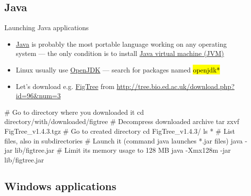\documentclass[compress, ucs, xelatex, 11pt, xcolor=svgnames, aspectratio=169,
	hyperref={
		bookmarks=true,
		unicode=true,
		colorlinks=true,
		pdftitle={Linux, command line and MetaCentrum},
		plainpages=false,
		pdfauthor={Vojtech Zeisek},
		pdfsubject={Course about use of Linux command line, writing shell scripts and using MetaCentrum of CESNET},
		pdfcreator={XeLaTeX},
		pdfkeywords={Linux, GNU, BASH, shell, command line, MetaCentrum},
		linkcolor=DarkRed, %
		anchorcolor=DarkBlue, %
		citecolor=Indigo, %
		filecolor=NavyBlue, %
		menucolor=DarkMagenta, %
		urlcolor=DarkBlue, %
		pdftex},
	url={hyphens, lowtilde} %
	]{beamer}
\renewcommand{\texttt}[1]{\hl{\ttfamily #1}}
\begin{document}
\subsection{Java}

\begin{frame}[fragile]{Launching Java applications}
	\begin{itemize}
		\item \href{https://www.java.com/}{Java} is probably the most portable language working on any operating system --- the only condition is to install \href{https://en.wikipedia.org/wiki/Java_virtual_machine}{Java virtual machine (JVM)}
		\item Linux usually use \href{https://openjdk.java.net/}{OpenJDK} --- search for packages named \texttt{*openjdk*}
		\item Let's download e.g. \href{http://tree.bio.ed.ac.uk/software/figtree/}{FigTree} from \url{http://tree.bio.ed.ac.uk/download.php?id=96&num=3}
	\end{itemize}
	\vfill
	\begin{bashcode}
    # Go to directory where you downloaded it
    cd directory/with/downloaded/figtree
    # Decompress downloaded archive
    tar zxvf FigTree_v1.4.3.tgz
    # Go to created directory
    cd FigTree_v1.4.3/
    ls * # List files, also in subdirectories
    # Launch it (command java launches *.jar files)
    java -jar lib/figtree.jar
    # Limit its memory usage to 128 MB
    java -Xmx128m -jar lib/figtree.jar
	\end{bashcode}
\end{frame}

\subsection{Windows applications}
\end{document}
